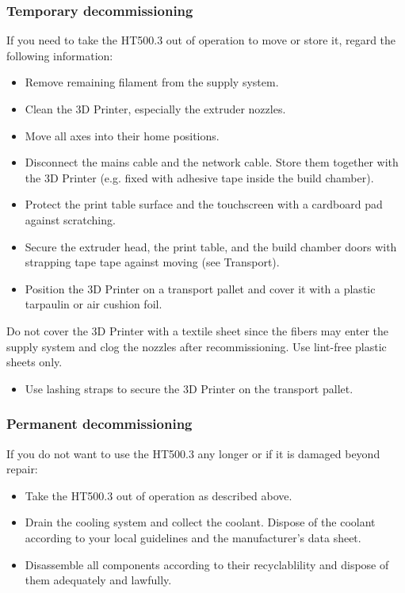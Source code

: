\subsubsection{Temporary decommissioning}

 If you need to take the HT500.3 out of operation to move or store it, regard the following information:
\begin{itemize}
  \item Remove remaining filament from the supply system.
  \item Clean the 3D Printer, especially the extruder nozzles.
  \item Move all axes into their home positions.
  \item Disconnect the mains cable and the network cable. Store them together with the 3D Printer 
        (e.g. fixed with adhesive tape inside the build chamber).
  \item Protect the print table surface and the touchscreen with a cardboard pad against scratching.
  \item Secure the extruder head, the print table, and the build chamber doors with strapping tape tape against moving (see Transport).
  \item Position the 3D Printer on a transport pallet and cover it with a plastic tarpaulin or air cushion foil.
\end{itemize}

\begin{notice}
  Do not cover the 3D Printer with a textile sheet since the fibers may enter the supply system and clog the nozzles after recommissioning. Use lint-free plastic sheets only.
\end{notice}

\begin{itemize}
  \item Use lashing straps to secure the 3D Printer on the transport pallet. 
\end{itemize}


\subsubsection{Permanent decommissioning}

 If you do not want to use the HT500.3 any longer or if it is damaged beyond repair:
\begin{itemize}
  \item Take the HT500.3 out of operation as described above.
  \item Drain the cooling system and collect the coolant. 
        Dispose of the coolant according to your local guidelines and the manufacturer's data sheet.
  \item Disassemble all components according to their recyclablility and dispose of them adequately and lawfully.
\end{itemize}

